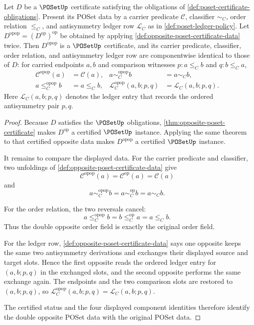 \begin{theorem}
\label{thm:double-opposite-poset-certificate-data-identity}
Let $D$ be a $\POSetUp$ certificate satisfying the obligations of
\autoref{def:poset-certificate-obligations}. Present its POSet data by a
carrier predicate $\mathcal C$, classifier $\sim_C$, order relation $\le_C$,
and antisymmetry ledger row $\mathcal L_C$ as in
\autoref{def:poset-ledger-policy}. Let
$D^{\mathrm{opop}}=(D^{\mathrm{op}})^{\mathrm{op}}$ be obtained by applying
\autoref{def:opposite-poset-certificate-data} twice. Then
$D^{\mathrm{opop}}$ is a $\POSetUp$ certificate, and its carrier predicate,
classifier, order relation, and antisymmetry ledger row are componentwise
identical to those of $D$: for carried endpoints $a,b$ and comparison
witnesses $p:a\le_C b$ and $q:b\le_C a$,
$$
\begin{aligned}
\mathcal C^{\mathrm{opop}}(a)&=\mathcal C(a),&
a\sim_C^{\mathrm{opop}}b&=a\sim_C b,\\
a\le_C^{\mathrm{opop}}b&=a\le_C b,&
\mathcal L_C^{\mathrm{opop}}(a,b;p,q)&=\mathcal L_C(a,b;p,q).
\end{aligned}
$$
Here $\mathcal L_C(a,b;p,q)$ denotes the ledger entry that records the
ordered antisymmetry pair $p,q$.
\end{theorem}
\begin{proof}
Because $D$ satisfies the $\POSetUp$ obligations,
\autoref{thm:opposite-poset-certificate} makes $D^{\mathrm{op}}$ a certified
$\POSetUp$ instance. Applying the same theorem to that certified opposite data
makes $D^{\mathrm{opop}}$ a certified $\POSetUp$ instance.

It remains to compare the displayed data. For the carrier predicate and
classifier, two unfoldings of \autoref{def:opposite-poset-certificate-data}
give
$$
\mathcal C^{\mathrm{opop}}(a)=\mathcal C^{\mathrm{op}}(a)=\mathcal C(a)
$$
and
$$
a\sim_C^{\mathrm{opop}}b=a\sim_C^{\mathrm{op}}b=a\sim_C b.
$$

For the order relation, the two reversals cancel:
$$
a\le_C^{\mathrm{opop}}b
=b\le_C^{\mathrm{op}}a
=a\le_C b.
$$
Thus the double opposite order field is exactly the original order field.

For the ledger row, \autoref{def:opposite-poset-certificate-data} says one
opposite keeps the same two antisymmetry derivations and exchanges their
displayed source and target slots. Hence the first opposite reads the ordered
ledger entry for $(a,b;p,q)$ in the exchanged slots, and the second opposite
performs the same exchange again. The endpoints and the two comparison slots
are restored to $(a,b;p,q)$, so
$\mathcal L_C^{\mathrm{opop}}(a,b;p,q)=\mathcal L_C(a,b;p,q)$.

The certified status and the four displayed component identities therefore
identify the double opposite POSet data with the original POSet data.
\end{proof}

